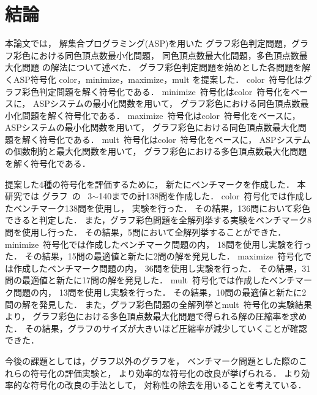 \chapter{結論}\label{chap]conclusion}
本論文では，
解集合プログラミング(ASP)を用いた
グラフ彩色判定問題，グラフ彩色における同色頂点数最小化問題，
同色頂点数最大化問題，多色頂点数最大化問題
の解法について述べた．
グラフ彩色判定問題を始めとした各問題を解くASP符号化
\textsf{color}，\textsf{minimize}，\textsf{maximize}，\textsf{mult}
を提案した．
\textsf{color}~符号化はグラフ彩色判定問題を解く符号化である．
\textsf{minimize}~符号化は\textsf{color}~符号化をベースに，
ASPシステムの最小化関数を用いて，
グラフ彩色における同色頂点数最小化問題を解く符号化である．
\textsf{maximize}~符号化は\textsf{color}~符号化をベースに，
ASPシステムの最小化関数を用いて，
グラフ彩色における同色頂点数最大化問題を解く符号化である．
\textsf{mult}~符号化は\textsf{color}~符号化をベースに，
ASPシステムの個数制約と最大化関数を用いて，
グラフ彩色における多色頂点数最大化問題を解く符号化である．

提案した4種の符号化を評価するために，
新たにベンチマークを作成した．
本研究では
グラフ~\cite{Knuth:TAOCP:SAT}の
~3$\sim$140までの計138問を作成した．
\textsf{color}~符号化では作成したベンチマーク138問を使用し，
実験を行った．
その結果，136問において彩色できると判定した．
また，グラフ彩色問題を全解列挙する実験をベンチマーク8問を使用し行った．
その結果，5問において全解列挙することができた．
\textsf{minimize}~符号化では作成したベンチマーク問題の内，
18問を使用し実験を行った．
その結果，15問の最適値と新たに2問の解を発見した．
\textsf{maximize}~符号化では作成したベンチマーク問題の内，
36問を使用し実験を行った．
その結果，31問の最適値と新たに17問の解を発見した．
\textsf{mult}~符号化では作成したベンチマーク問題の内，
13問を使用し実験を行った．
その結果，10問の最適値と新たに2問の解を発見した．
また，グラフ彩色問題の全解列挙と\textsf{mult}~符号化の実験結果より，
グラフ彩色における多色頂点数最大化問題で得られる解の圧縮率を求めた．
その結果，グラフのサイズが大きいほど圧縮率が減少していくことが確認できた．

今後の課題としては，グラフ以外のグラフを，
ベンチマーク問題とした際のこれらの符号化の評価実験と，
より効率的な符号化の改良が挙げられる．
より効率的な符号化の改良の手法として，
対称性の除去を用いることを考えている．

